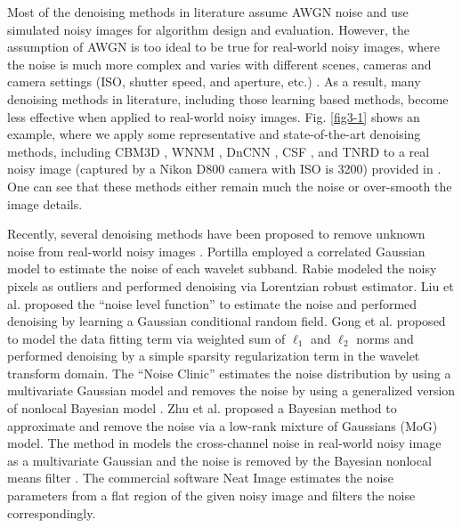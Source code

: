 Most of the denoising methods in literature \cite{bayesshrink,curvelet,ksvd,lssc,ncsr,bm3d,cbm3d,
zhou2012nonparametric,Tomasi1998,blsgsm,nlm,nlbayes,wnnm,pgpd,foe,epll,
mlp,xie2012image,dncnn,barbu2009training,csf,tnrd} assume AWGN noise and use simulated noisy images for algorithm design and evaluation. However, the assumption of AWGN is too ideal to be true for real-world noisy images, where the noise is much more complex and varies with different scenes, cameras and camera settings (ISO, shutter speed, and aperture, etc.) \cite{crosschannel2016,healey1994radiometric}. As a result, many denoising methods in literature, including those learning based methods, become less effective when applied to real-world noisy images. Fig. \ref{fig3-1} shows an example, where we apply some representative and state-of-the-art denoising methods, including CBM3D \cite{cbm3d}, WNNM \cite{wnnm}, DnCNN \cite{dncnn}, CSF \cite{csf}, and TNRD \cite{tnrd} to a real noisy image (captured by a Nikon D800 camera with ISO is 3200) provided in \cite{crosschannel2016}. One can see that these methods either remain much the noise or over-smooth the image details.

Recently, several denoising methods have been proposed to remove unknown noise from real-world noisy images \cite{fullyblind,rabie2005robust,Liu2008,almapg,crosschannel2016,Zhu_2016_CVPR,noiseclinic,ncwebsite}. Portilla \cite{fullyblind} employed a correlated Gaussian model to estimate the noise of each wavelet subband. Rabie \cite{rabie2005robust} modeled the noisy pixels as outliers and performed denoising via Lorentzian robust estimator. Liu et al. \cite{Liu2008} proposed the ``noise level function'' to estimate the noise and performed denoising by learning a Gaussian conditional random field. Gong et al. \cite{almapg} proposed to model the data fitting term via weighted sum of $\ell_{1}$ and $\ell_{2}$ norms and performed denoising by a simple sparsity regularization term in the wavelet transform domain. The ``Noise Clinic'' \cite{noiseclinic,ncwebsite} estimates the noise distribution by using a multivariate Gaussian model and removes the noise by using a generalized version of nonlocal Bayesian model \cite{nlbayes}. Zhu et al. \cite{Zhu_2016_CVPR} proposed a Bayesian method to approximate and remove the noise via a low-rank mixture of Gaussians (MoG) model. The method in \cite{crosschannel2016} models the cross-channel noise in real-world noisy image as a multivariate Gaussian and the noise is removed by the Bayesian nonlocal means filter \cite{kervrann2007bayesian}. The commercial software Neat Image \cite{neatimage} estimates the noise parameters from a flat region of the given noisy image and filters the noise correspondingly. 

